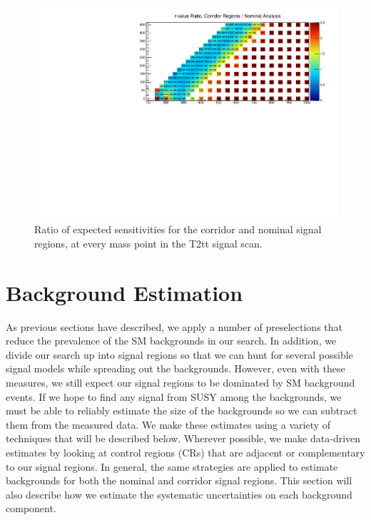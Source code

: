 \begin{figure}
\centering
\includegraphics{figures/rratioplot.pdf}
\caption{Ratio of expected sensitivities for the corridor and nominal
  signal regions, at every mass point in the T2tt signal scan.}
\label{fig:stop:rratio}
\end{figure}


\section{Background Estimation}
\label{sec:stop:bkgest}

As previous sections have described, we apply a number of
preselections that reduce the prevalence of the SM backgrounds in our
search. In addition, we divide our search up into signal
regions so that we can hunt for several possible signal models while
spreading out the backgrounds. However, even with these measures,
we still expect our signal regions to be dominated by SM background
events. If we hope to find any signal from SUSY among the backgrounds,
we must be able to reliably estimate the size of the backgrounds so we
can subtract them from the measured data. We make these estimates
using a variety of techniques that will be described below. Wherever
possible, we make data-driven estimates by looking at control regions
(CRs) that are adjacent or complementary to our signal regions. In
general, the same strategies are applied to estimate backgrounds for
both the nominal and corridor signal regions. This section will also
describe how we estimate the systematic uncertainties on each
background component.

